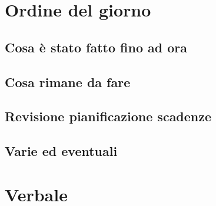 \documentclass[italian,12pt]{article}
\begin{document}
\section{Ordine del giorno}
\subsection{Cosa è stato fatto fino ad ora}
\subsection{Cosa rimane da fare}
\subsection{Revisione pianificazione scadenze}
\subsection{Varie ed eventuali}

\newpage

\section{Verbale}
\end{document}
